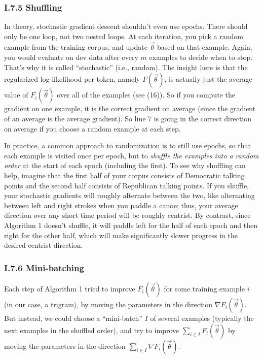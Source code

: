 \subsubsection*{I.7.5 Shuffling}

In theory, stochastic gradient descent shouldn’t even use epochs. There should only be one loop, not two nested loops. At each iteration, you pick a random example from the training corpus, and update $\vec{\theta}$ based on that example. Again, you would evaluate on dev data after every $m$ examples to decide when to stop. That’s why it is called “stochastic” (i.e., random). The insight here is that the regularized log-likelihood per token, namely $F(\vec{\theta})$, is actually just the average value of $F_i(\vec{\theta})$ over all of the examples (see (16)). So if you compute the gradient on one example, it is the correct gradient on average (since the gradient of an average is the average gradient). So line 7 is going in the correct direction on average if you choose a random example at each step.

In practice, a common approach to randomization is to still use epochs, so that each example is visited once per epoch, but to \emph{shuffle the examples into a random order} at the start of each epoch (including the first). To see why shuffling can help, imagine that the first half of your corpus consists of Democratic talking points and the second half consists of Republican talking points. If you shuffle, your stochastic gradients will roughly alternate between the two, like alternating between left and right strokes when you paddle a canoe; thus, your average direction over any short time period will be roughly centrist. By contrast, since Algorithm 1 doesn’t shuffle, it will paddle left for the half of each epoch and then right for the other half, which will make significantly slower progress in the desired centrist direction.

\subsubsection*{I.7.6 Mini-batching}

Each step of Algorithm 1 tried to improve $F_i(\vec{\theta})$ for some training example $i$ (in our case, a trigram), by moving the parameters in the direction $\nabla F_i(\vec{\theta})$. But instead, we could choose a “mini-batch” $I$ of several examples (typically the next examples in the shuffled order), and try to improve $\sum_{i \in I} F_i(\vec{\theta})$ by moving the parameters in the direction $\sum_{i \in I} \nabla F_i(\vec{\theta})$.

